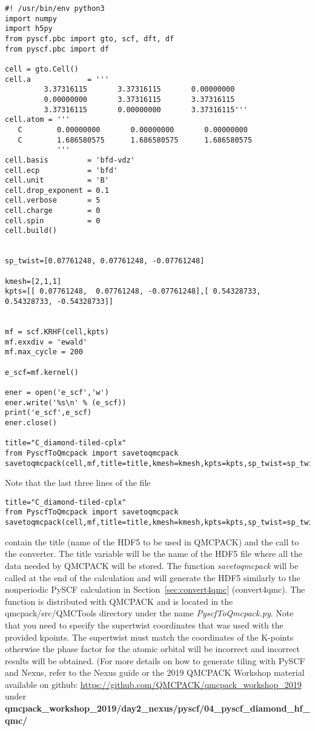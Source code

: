 \begin{lstlisting}[style=Python,caption=Example PySCF input for single k-point calculation for a $2 \times 1 \times 1$ carbon supercell.]
#! /usr/bin/env python3
import numpy
import h5py
from pyscf.pbc import gto, scf, dft, df
from pyscf.pbc import df

cell = gto.Cell()
cell.a             = '''
         3.37316115       3.37316115       0.00000000
         0.00000000       3.37316115       3.37316115
         3.37316115       0.00000000       3.37316115'''
cell.atom = '''  
   C        0.00000000       0.00000000       0.00000000
   C        1.686580575      1.686580575      1.686580575 
            '''
cell.basis         = 'bfd-vdz'
cell.ecp           = 'bfd'
cell.unit          = 'B'
cell.drop_exponent = 0.1
cell.verbose       = 5
cell.charge        = 0
cell.spin          = 0
cell.build()


sp_twist=[0.07761248, 0.07761248, -0.07761248]

kmesh=[2,1,1]
kpts=[[ 0.07761248,  0.07761248, -0.07761248],[ 0.54328733,  0.54328733, -0.54328733]]


mf = scf.KRHF(cell,kpts)
mf.exxdiv = 'ewald'
mf.max_cycle = 200

e_scf=mf.kernel()

ener = open('e_scf','w')
ener.write('%s\n' % (e_scf))
print('e_scf',e_scf)
ener.close()

title="C_diamond-tiled-cplx"
from PyscfToQmcpack import savetoqmcpack
savetoqmcpack(cell,mf,title=title,kmesh=kmesh,kpts=kpts,sp_twist=sp_twist)

\end{lstlisting}

Note that the last three lines of the file
\begin{lstlisting}[style=Python]
title="C_diamond-tiled-cplx"
from PyscfToQmcpack import savetoqmcpack
savetoqmcpack(cell,mf,title=title,kmesh=kmesh,kpts=kpts,sp_twist=sp_twist)
\end{lstlisting}

contain the title (name of the HDF5 to be used in QMCPACK) and the call to the converter. The title variable will be the name of the
HDF5 file where all the data needed by QMCPACK will be stored.  The
function \textit{savetoqmcpack} will be called at the end of the
calculation and will generate the HDF5 similarly to the nonperiodic
PySCF calculation in Section~\ref{sec:convert4qmc} (convert4qmc). The
function is distributed with QMCPACK and is located in the
qmcpack/src/QMCTools directory under the name
\textit{PyscfToQmcpack.py}. Note that you need to specify the supertwist coordinates that was used with the provided kpoints. The supertwist must match the coordinates of the K-points otherwise the phase factor for the atomic orbital will be incorrect and incorrect results will be obtained. (For more details on how to generate tiling with PySCF and Nexus,  refer to the Nexus guide or the 2019 QMCPACK Workshop material available on github: \url{https://github.com/QMCPACK/qmcpack_workshop_2019} under \textbf{qmcpack\_workshop\_2019/day2\_nexus/pyscf/04\_pyscf\_diamond\_hf\_qmc/}

